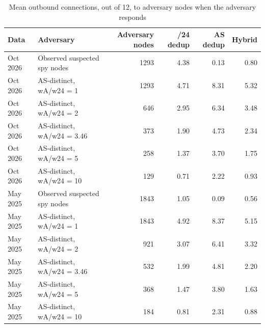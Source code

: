 \begin{table}[t]
\caption{
{\fontsize{20}{25}\selectfont  Mean outbound connections, out of 12, to adversary nodes when the adversary responds}
} 
\begin{tabular*}{\linewidth}{@{\extracolsep{\fill}}llrrrr}
\toprule
Data & Adversary & Adversary nodes & /24 dedup & AS dedup & Hybrid \\ 
\midrule\addlinespace[2.5pt]
Oct 2026 & Observed suspected spy nodes & 1293 & 4.38 & 0.13 & 0.80 \\ 
Oct 2026 & AS-distinct, wA/w24 = 1 & 1293 & 4.71 & 8.31 & 5.32 \\ 
Oct 2026 & AS-distinct, wA/w24 = 2 & 646 & 2.95 & 6.34 & 3.48 \\ 
Oct 2026 & AS-distinct, wA/w24 = 3.46 & 373 & 1.90 & 4.73 & 2.34 \\ 
Oct 2026 & AS-distinct, wA/w24 = 5 & 258 & 1.37 & 3.70 & 1.75 \\ 
Oct 2026 & AS-distinct, wA/w24 = 10 & 129 & 0.71 & 2.22 & 0.93 \\ 
May 2025 & Observed suspected spy nodes & 1843 & 1.05 & 0.09 & 0.56 \\ 
May 2025 & AS-distinct, wA/w24 = 1 & 1843 & 4.92 & 8.37 & 5.15 \\ 
May 2025 & AS-distinct, wA/w24 = 2 & 921 & 3.07 & 6.41 & 3.32 \\ 
May 2025 & AS-distinct, wA/w24 = 3.46 & 532 & 1.99 & 4.81 & 2.20 \\ 
May 2025 & AS-distinct, wA/w24 = 5 & 368 & 1.47 & 3.80 & 1.63 \\ 
May 2025 & AS-distinct, wA/w24 = 10 & 184 & 0.81 & 2.31 & 0.88 \\ 
\bottomrule
\end{tabular*}
\label{table-response}
\end{table}
